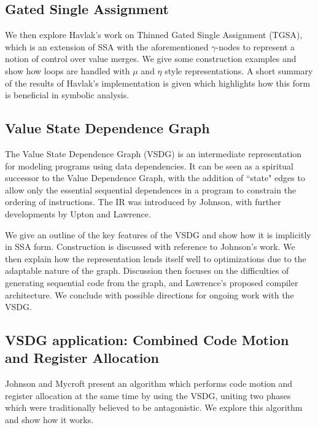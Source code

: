 \subsection*{Gated Single Assignment}

We then explore Havlak's work\cite{Havlak93constructionof} on Thinned Gated Single Assignment (TGSA), which is an extension of SSA with the aforementioned $\gamma$-nodes to represent a notion of control over value merges. We give some construction examples and show how loops are handled with $\mu$ and $\eta$ style representations. A short summary of the results of Havlak's implementation is given which highlights how this form is beneficial in symbolic analysis.

\subsection*{Value State Dependence Graph}

The Value State Dependence Graph (VSDG) is an intermediate representation for modeling programs using data dependencies. It can be seen as a spiritual successor to the Value Dependence Graph\cite{177907}, with the addition of ``state" edges to allow only the essential sequential dependences in a program to constrain the ordering of instructions. The IR was introduced by Johnson\cite{UCAM-CL-TR-607}, with further developments by Upton\cite{upton} and Lawrence\cite{UCAM-CL-TR-705}.

We give an outline of the key features of the VSDG and show how it is implicitly in SSA form. Construction is discussed with reference to Johnson's work. We then explain how the representation lends itself well to optimizations due to the adaptable nature of the graph. Discussion then focuses on the difficulties of generating sequential code from the graph\cite{DBLP:conf/pdpta/Upton03}, and Lawrence's proposed compiler architecture. We conclude with possible directions for ongoing work with the VSDG.

\subsection*{VSDG application: Combined Code Motion and Register Allocation}

Johnson and Mycroft \cite{johnson-combined} present an algorithm which performs code motion and register allocation at the same time by using the VSDG, uniting two phases which were traditionally believed to be antagonistic. We explore this algorithm and show how it works.


